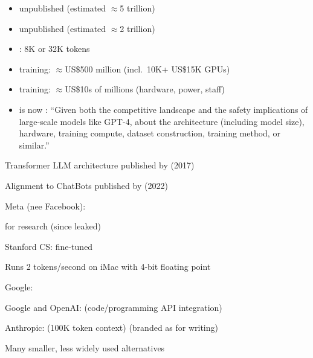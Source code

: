 \documentclass[9pt]{report}
\begin{document}
{
\begin{itemize}
\item {} unpublished (estimated $\approx$5 trillion)
\item {} unpublished (estimated $\approx$2
  trillion)
\item {}: 8K or 32K tokens
\item {} training: $\approx$US\$500 million
  (incl.\ 10K+ US\$15K GPUs)
\item {} training: $\approx$US\$10s of
  millions (hardware, power, staff)
  \vfill
\item {} is now : {\small ``Given both
the competitive landscape and the safety implications of large-scale models like GPT-4,  about the architecture (including model size), hardware, training compute,
dataset construction, training method, or similar.''}
\end{itemize}

\begin{itemize}
\item Transformer LLM architecture published by  (2017)
\item Alignment to ChatBots published by  (2022)
\begin{subitemize}
\item Meta (nee Facebook): 
  \vspace*{3pt}
  \begin{subitemize}
    \item {} for research (since leaked)
    \item Stanford CS:  fine-tuned
    \item Runs 2 tokens/second on iMac with 4-bit floating point
    \end{subitemize}
  \item Google: 
  \item Google and OpenAI:  (code/programming API integration)
\item Anthropic:  (100K token context) (branded as  for writing) 
\item Many smaller, less widely used alternatives
\end{subitemize}
\end{itemize}


}
\end{document}
